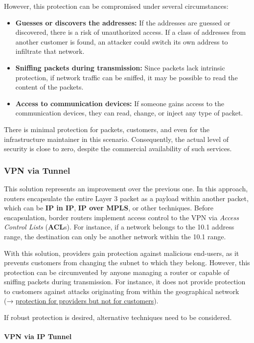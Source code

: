 However, this protection can be compromised under several circumstances:
\begin{itemize}
	\item \textbf{Guesses or discovers the addresses:} If the addresses are guessed or discovered, there is a risk of unauthorized access. If a class of addresses from another customer is found, an attacker could switch its own address to infiltrate that network.
	\item \textbf{Sniffing packets during transmission:} Since packets lack intrinsic protection, if network traffic can be sniffed, it may be possible to read the content of the packets.
	\item \textbf{Access to communication devices:} If someone gains access to the communication devices, they can read, change, or inject any type of packet.
\end{itemize}

There is minimal protection for packets, customers, and even for the infrastructure maintainer in this scenario. Consequently, the actual level of security is close to zero, despite the commercial availability of such services.


\subsubsection{VPN via Tunnel}

This solution represents an improvement over the previous one. In this approach, routers encapsulate the entire Layer 3 packet as a payload within another packet, which can be \textbf{IP in IP}, \textbf{IP over MPLS}, or other techniques. Before encapsulation, border routers implement access control to the VPN via \textit{Access Control Lists} (\textbf{ACL}s). For instance, if a network belongs to the 10.1 address range, the destination can only be another network within the 10.1 range.

With this solution, providers gain protection against malicious end-users, as it prevents customers from changing the subnet to which they belong.
However, this protection can be circumvented by anyone managing a router or capable of sniffing packets during transmission. For instance, it does not provide protection to customers against attacks originating from within the geographical network (→ \ul{protection for providers but not for customers}).

If robust protection is desired, alternative techniques need to be considered.


\paragraph{VPN via IP Tunnel}

